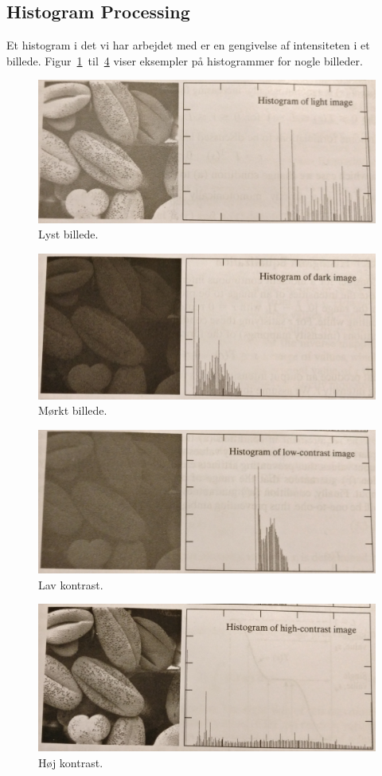 \subsection{Histogram Processing}\label{sec:histogram-processing}

Et histogram i det vi har arbejdet med er en gengivelse af intensiteten i et billede. Figur~\ref{fig:hist-light}~til~\ref{fig:hist-high} viser eksempler på histogrammer for nogle billeder.

\begin{figure}[H]
	\centering
	\includegraphics[width=0.6\linewidth]{figs/spm01/hist-light.png}
	\caption{Lyst billede.}
	\label{fig:hist-light}
\end{figure}

\begin{figure}[H]
	\centering
	\includegraphics[width=0.6\linewidth]{figs/spm01/hist-dark.png}
	\caption{Mørkt billede.}
	\label{fig:hist-dark}
\end{figure}

\begin{figure}[H]
	\centering
	\includegraphics[width=0.6\linewidth]{figs/spm01/hist-low.png}
	\caption{Lav kontrast.}
	\label{fig:hist-low}
\end{figure}

\begin{figure}[H]
	\centering
	\includegraphics[width=0.6\linewidth]{figs/spm01/hist-high.png}
	\caption{Høj kontrast.}
	\label{fig:hist-high}
\end{figure}